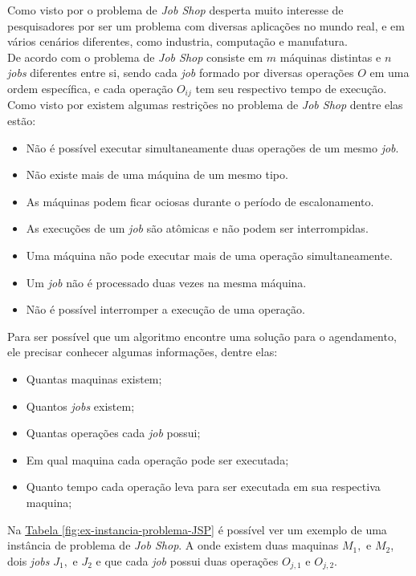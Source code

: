 Como visto por \cite{Cheng1996} o problema de \textit{Job Shop} desperta muito interesse de pesquisadores por ser um problema com diversas aplicações no mundo real, e em vários cenários diferentes, como industria, computação e manufatura.\\
%
\indent De acordo com \cite{Cheng1996} o problema de \textit{Job Shop} consiste em $m$ máquinas distintas e $n$ \textit{jobs} diferentes entre si, sendo cada \textit{job} formado por diversas operações $O$ em uma ordem específica, e cada operação $O_{ij}$ tem seu respectivo tempo de execução.\\
%
\indent Como visto por \cite{Bagchi1999} existem algumas restrições no problema de \textit{Job Shop} dentre elas estão:
\begin{itemize}
    \item Não é possível executar simultaneamente duas operações de um mesmo \textit{job}.
    \item Não existe mais de uma máquina de um mesmo tipo.
    \item As máquinas podem ficar ociosas durante o período de escalonamento.
    \item As execuções de um \textit{job} são atômicas e não podem ser interrompidas.
    \item Uma máquina não pode executar mais de uma operação simultaneamente.
    \item Um \textit{job} não é processado duas vezes na mesma máquina.
    \item Não é possível interromper a execução de uma operação.
\end{itemize}
\indent Para ser possível que um algoritmo encontre uma solução para o agendamento, ele precisar conhecer algumas informações, dentre elas: 
\begin{itemize}
    \item Quantas maquinas existem;
    \item Quantos \textit{jobs} existem;
    \item Quantas operações cada \textit{job} possui;
    \item Em qual maquina cada operação pode ser executada;
    \item Quanto tempo cada operação leva para ser executada em sua respectiva maquina;
\end{itemize}
Na 
\hyperref[fig:ex-instancia-problema-JSP]{Tabela \ref{fig:ex-instancia-problema-JSP}}
é possível ver um exemplo de uma instância de problema de \textit{Job Shop}. 
A onde existem duas maquinas $M_1, $ e $M_2$, 
dois \textit{jobs} $J_1, $ e $J_2$ 
e que cada \textit{job} possui 
duas operações $O_{j,1} $ e $O_{j,2}$.
    
